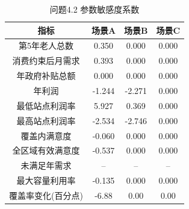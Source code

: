 \begin{table}[htbp]
\centering
\caption{问题4.2 参数敏感度系数}
\begin{tabular}{|c|c|c|c|}
\hline
指标 & 场景A & 场景B & 场景C \\
\hline
第5年老人总数 & 0.350 & 0.000 & 0.000 \\
消费约束后月需求 & 0.393 & 0.000 & 0.000 \\
年政府补贴总额 & 0.000 & 0.000 & 0.000 \\
年利润 & -1.244 & -2.271 & 0.000 \\
最低站点利润率 & 5.927 & 0.369 & 0.000 \\
最高站点利润率 & -2.534 & -2.746 & 0.000 \\
覆盖内满意度 & -0.060 & 0.000 & 0.000 \\
全区域有效满意度 & -0.537 & 0.000 & 0.000 \\
未满足年需求 & -- & -- & -- \\
最大容量利用率 & -0.135 & 0.000 & 0.000 \\
覆盖率变化(百分点) & -6.88 & 0.00 & 0.00 \\
\hline
\end{tabular}
\end{table}
